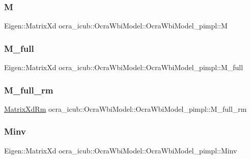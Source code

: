 \subsubsection{\texorpdfstring{M}{M}}
{\footnotesize\ttfamily Eigen\+::\+Matrix\+Xd ocra\+\_\+icub\+::\+Ocra\+Wbi\+Model\+::\+Ocra\+Wbi\+Model\+\_\+pimpl\+::M}

\hypertarget{structOcraWbiModel_1_1OcraWbiModel__pimpl_af57ebe4c5c15477a9592dd91a5c96f12}{}\label{structOcraWbiModel_1_1OcraWbiModel__pimpl_af57ebe4c5c15477a9592dd91a5c96f12} 
\subsubsection{\texorpdfstring{M\+\_\+full}{M\_full}}
{\footnotesize\ttfamily Eigen\+::\+Matrix\+Xd ocra\+\_\+icub\+::\+Ocra\+Wbi\+Model\+::\+Ocra\+Wbi\+Model\+\_\+pimpl\+::\+M\+\_\+full}

\hypertarget{structOcraWbiModel_1_1OcraWbiModel__pimpl_a6ed8d69d83b0321920c0f79cf8e58bde}{}\label{structOcraWbiModel_1_1OcraWbiModel__pimpl_a6ed8d69d83b0321920c0f79cf8e58bde} 
\subsubsection{\texorpdfstring{M\+\_\+full\+\_\+rm}{M\_full\_rm}}
{\footnotesize\ttfamily \hyperlink{namespaceocra__icub_aa5e36a19ed031c28ca83c207bd7dd83f}{Matrix\+Xd\+Rm} ocra\+\_\+icub\+::\+Ocra\+Wbi\+Model\+::\+Ocra\+Wbi\+Model\+\_\+pimpl\+::\+M\+\_\+full\+\_\+rm}

\hypertarget{structOcraWbiModel_1_1OcraWbiModel__pimpl_a4d95e99d368b2e61c2945c1eeabff823}{}\label{structOcraWbiModel_1_1OcraWbiModel__pimpl_a4d95e99d368b2e61c2945c1eeabff823} 
\subsubsection{\texorpdfstring{Minv}{Minv}}
{\footnotesize\ttfamily Eigen\+::\+Matrix\+Xd ocra\+\_\+icub\+::\+Ocra\+Wbi\+Model\+::\+Ocra\+Wbi\+Model\+\_\+pimpl\+::\+Minv}

